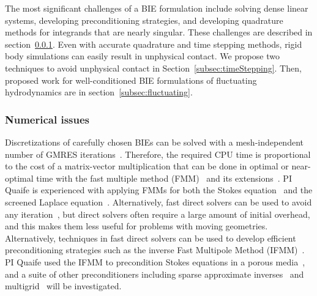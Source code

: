 The most significant challenges of a BIE formulation include solving
dense linear systems, developing preconditioning strategies, and
developing quadrature methods for integrands that are nearly singular.
These challenges are described in section~\ref{subsec:NumericalIssues}.
Even with accurate quadrature and time stepping methods, rigid body
simulations can easily result in unphysical contact. We propose two
techniques to avoid unphysical contact in
Section~\ref{subsec:timeStepping}. Then, proposed work for well-conditioned BIE
formulations of fluctuating hydrodynamics are in
section~\ref{subsec:fluctuating}.


\subsubsection{Numerical issues}
\label{subsec:NumericalIssues}

Discretizations of carefully chosen BIEs can be solved with a
mesh-independent number of GMRES
iterations~\cite{cam-ips-kel-mey-xue1996}. Therefore, the required CPU
time is proportional to the cost of a matrix-vector multiplication that
can be done in optimal or near-optimal time with the fast multiple
method (FMM)~\cite{fmm5} and its extensions~\cite{fmm1, fmm2, fmm3,
fmm4, fmm6, fmm7, fmm8}. PI Quaife is experienced with applying FMMs for
both the Stokes equation~\cite{qua-bir2014, bys-sha-qua2020} and the
screened Laplace equation~\cite{kro-qua2011, qua2011}. Alternatively,
fast direct solvers can be used to avoid any iteration~\cite{fds1, fds2,
fds3, fds4, fds5, fds6, fds7, fds8, ho2016cpam2, ho2016cpam1,
minden2016, minden2017siammms}, but direct solvers often require a large
amount of initial overhead, and this makes them less useful for problems
with moving geometries. Alternatively, techniques in fast direct solvers
can be used to develop efficient preconditioning strategies such as the
inverse Fast Multipole Method (IFMM)~\cite{cou-pou-dar2017}. PI Quaife
used the IFMM to precondition Stokes equations in a porous
media~\cite{qua-cou-dar2018}, and a suite of other preconditioners
including sparse approximate inverses~\cite{che2000} and
multigrid~\cite{hem-sch1981, sch1982} will be investigated.  

